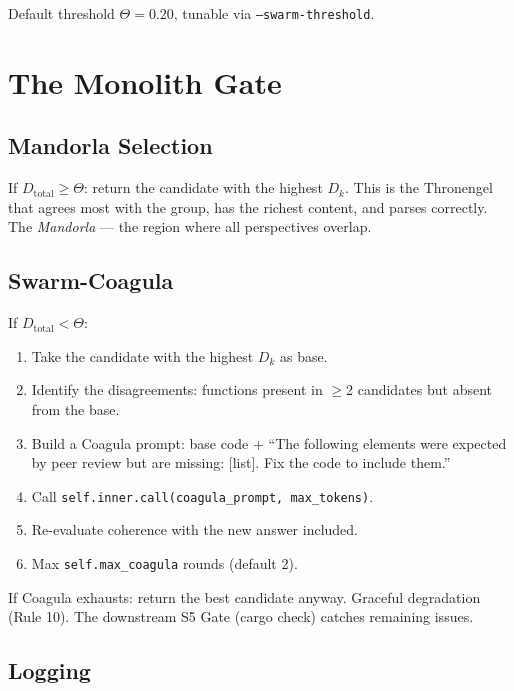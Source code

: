 \documentclass[11pt,a4paper]{article}
\begin{document}
Default threshold $\Theta = 0.20$, tunable via 
\texttt{--swarm-threshold}.


\section{The Monolith Gate}
\label{sec:monolith}

\subsection{Mandorla Selection}

If $D_\text{total} \geq \Theta$: return the candidate with the 
highest $D_k$. This is the Thronengel that agrees most with the 
group, has the richest content, and parses correctly. The 
\emph{Mandorla} --- the region where all perspectives overlap.

\subsection{Swarm-Coagula}

If $D_\text{total} < \Theta$:

\begin{enumerate}[nosep]
\item Take the candidate with the highest $D_k$ as base.
\item Identify the disagreements: functions present in $\geq$2 
      candidates but absent from the base.
\item Build a Coagula prompt: base code + ``The following elements 
      were expected by peer review but are missing: [list]. 
      Fix the code to include them.''
\item Call \texttt{self.inner.call(coagula\_prompt, max\_tokens)}.
\item Re-evaluate coherence with the new answer included.
\item Max \texttt{self.max\_coagula} rounds (default 2).
\end{enumerate}

If Coagula exhausts: return the best candidate anyway. Graceful 
degradation (Rule 10). The downstream S5 Gate (cargo check) 
catches remaining issues.

\subsection{Logging}
\end{document}

